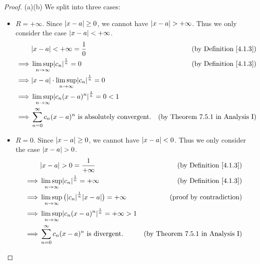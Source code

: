 \begin{proof}{(a)}{(b)}
    We split into three cases:
    \begin{itemize}
        \item \(R = +\infty\).
              Since \(\left\lvert x - a\right\rvert \geq 0\), we cannot have \(\left\lvert x - a\right\rvert > +\infty\).
              Thus we only consider the case \(\left\lvert x - a\right\rvert < +\infty\).
              \begin{align*}
                           & \abs{x - a} < +\infty = \frac{1}{0}                                  & \text{(by Definition \ref{4.1.3})}      \\
                  \implies & \limsup_{n \to \infty} \abs{c_n}^{\frac{1}{n}} = 0                   & \text{(by Definition \ref{4.1.3})}      \\
                  \implies & \abs{x - a} \cdot \limsup_{n \to \infty} \abs{c_n}^{\frac{1}{n}} = 0                                           \\
                  \implies & \limsup_{n \to \infty} \abs{c_n (x - a)^n}^{\frac{1}{n}} = 0 < 1                                               \\
                  \implies & \sum_{n = 0}^\infty c_n (x - a)^n \text{ is absolutely convergent}.  & \text{(by Theorem 7.5.1 in Analysis I)}
              \end{align*}
        \item \(R = 0\).
              Since \(\left\lvert x - a\right\rvert \geq 0\), we cannot have \(\left\lvert x - a\right\rvert < 0\).
              Thus we only consider the case \(\left\lvert x - a\right\rvert > 0\).
              \begin{align*}
                           & \abs{x - a} > 0 = \frac{1}{+\infty}                                            & \text{(by Definition \ref{4.1.3})}      \\
                  \implies & \limsup_{n \to \infty} \abs{c_n}^{\frac{1}{n}} = +\infty                       & \text{(by Definition \ref{4.1.3})}      \\
                  \implies & \limsup_{n \to \infty} \big(\abs{c_n}^{\frac{1}{n}} \abs{x - a}\big) = +\infty & \text{(proof by contradiction)}         \\
                  \implies & \limsup_{n \to \infty} \abs{c_n (x - a)^n}^{\frac{1}{n}} = +\infty > 1                                                   \\
                  \implies & \sum_{n = 0}^\infty c_n (x - a)^n \text{ is divergent}.                        & \text{(by Theorem 7.5.1 in Analysis I)}
              \end{align*}

\end{itemize}
\end{proof}
